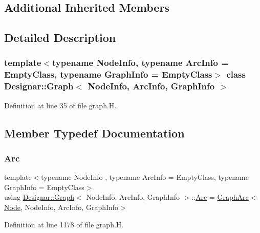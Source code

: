 \subsection*{Additional Inherited Members}


\subsection{Detailed Description}
\subsubsection*{template$<$typename Node\+Info, typename Arc\+Info = Empty\+Class, typename Graph\+Info = Empty\+Class$>$\newline
class Designar\+::\+Graph$<$ Node\+Info, Arc\+Info, Graph\+Info $>$}



Definition at line 35 of file graph.\+H.



\subsection{Member Typedef Documentation}
\mbox{\label{class_designar_1_1_graph_a74c730ef4ce2d20f998d72bd25c2b5bf}} 
\subsubsection{\texorpdfstring{Arc}{Arc}}
{\footnotesize\ttfamily template$<$typename Node\+Info , typename Arc\+Info  = Empty\+Class, typename Graph\+Info  = Empty\+Class$>$ \\
using \hyperlink{class_designar_1_1_graph}{Designar\+::\+Graph}$<$ Node\+Info, Arc\+Info, Graph\+Info $>$\+::\hyperlink{class_designar_1_1_graph_a74c730ef4ce2d20f998d72bd25c2b5bf}{Arc} =  \hyperlink{class_designar_1_1_graph_arc}{Graph\+Arc}$<$\hyperlink{class_designar_1_1_graph_a5dfc7dba9d092ac489c72e40390c37d0}{Node}, Node\+Info, Arc\+Info, Graph\+Info$>$}



Definition at line 1178 of file graph.\+H.

\mbox{\label{class_designar_1_1_graph_abc2adb4841a6d092d5093f9e60f2c8be}} 
